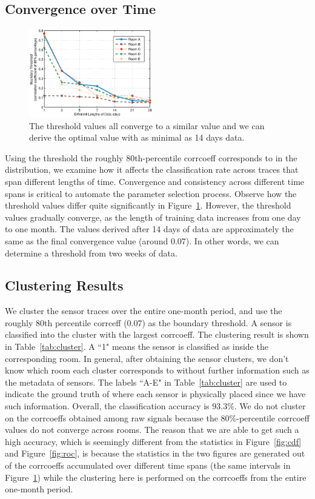 \subsection{Convergence over Time}
\begin{figure}[h!]
\centering
	\includegraphics[width=0.48\textwidth]{figs/lengtheffect.eps}
\caption{The threshold values all converge to a similar value and we can derive the optimal value with as minimal as 14 days data.}
\label{fig:leneff}
\end{figure}

Using the threshold the roughly 80th-percentile corrcoeff corresponds to in the distribution, we examine how it affects the classification rate across traces
that span different lengths of time.  Convergence and consistency across different time spans is critical to automate the parameter selection
process.
Observe how the  threshold values differ quite significantly in Figure~\ref{fig:leneff}.  However, 
the threshold values 
gradually converge, as the length of training data increases from one day to one month.  The values derived after 14 days of data
are approximately the same as the final convergence value (around 0.07).  In other words, we can determine a threshold from two weeks of data.

\subsection{Clustering Results}
We cluster the sensor traces over the entire one-month period, and use the roughly 80th percentile corrceff (0.07) as the boundary threshold. 
A sensor is classified into the cluster with the largest corrcoeff. The clustering result is shown in Table~\ref{tab:cluster}.  A ``1" means the sensor is classified as inside the corresponding room. 
In general, after obtaining the sensor clusters, we don't know which room each cluster corresponds to without further information such as the metadata of sensors. The labels ``A-E" in Table~\ref{tab:cluster} are used to indicate the ground truth of where each sensor is physically placed since we have such information. Overall, the classification accuracy 
is 93.3\%.  We do not cluster on the corrcoeffs obtained among raw signals because the 80\%-percentile corrcoeff values do not converge across rooms.
The reason that we are able to get such a high accuracy, which is seemingly different from the statistics in Figure~\ref{fig:cdf} and Figure~\ref{fig:roc}, is because the statistics in the two figures are generated out of the corrcoeffs accumulated over different time spans (the same intervals in Figure~\ref{fig:leneff}) while the clustering here is performed on the corrcoeffs from the entire one-month period. 

